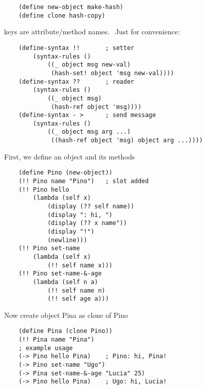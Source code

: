 \begin{lstlisting}
    (define new-object make-hash)
    (define clone hash-copy)
\end{lstlisting}
keys are attribute/method names. \
Just for convenience:
\begin{lstlisting}
    (define-syntax !!       ; setter
        (syntax-rules ()
            ((_ object msg new-val)
             (hash-set! object 'msg new-val))))
    (define-syntax ??       ; reader
        (syntax-rules ()
            ((_ object msg)
             (hash-ref object 'msg))))
    (define-syntax - >      ; send message
        (syntax-rules ()
            ((_ object msg arg ...)
             ((hash-ref object 'msg) object arg ...))))
\end{lstlisting}
First, we define an object and its methods
\begin{lstlisting}
    (define Pino (new-object))
    (!! Pino name "Pino")   ; slot added
    (!! Pino hello 
        (lambda (self x)
            (display (?? self name))
            (display ": hi, ")
            (display (?? x name"))
            (display "!")
            (newline)))
    (!! Pino set-name
        (lambda (self x)
            (!! self name x)))
    (!! Pino set-name-&-age
        (lambda (self n a)
            (!! self name n)
            (!! self age a)))
\end{lstlisting}
Now create object Pina as clone of Pino
\begin{lstlisting}
    (define Pina (clone Pino))
    (!! Pina name "Pina")
    ; example usage
    (-> Pino hello Pina)    ; Pino: hi, Pina!
    (-> Pino set-name "Ugo")
    (-> Pina set-name-&-age "Lucia" 25)
    (-> Pino hello Pina)    ; Ugo: hi, Lucia!
\end{lstlisting}


